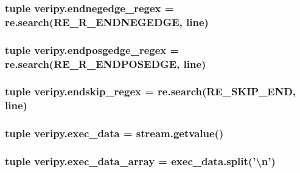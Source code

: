 \hypertarget{namespaceveripy_a9985df4799df5dec0cca48bdf7e184ac}{
\subsubsection[{endnegedge\-\_\-regex}]{\setlength{\rightskip}{0pt plus 5cm}tuple veripy.\-endnegedge\-\_\-regex = re.\-search(R\-E\-\_\-\-R\-\_\-\-E\-N\-D\-N\-E\-G\-E\-D\-G\-E, {\bf line})}}\label{namespaceveripy_a9985df4799df5dec0cca48bdf7e184ac}
\hypertarget{namespaceveripy_afd21c96a818fcc01594b0a193e25f0f3}{
\subsubsection[{endposgedge\-\_\-regex}]{\setlength{\rightskip}{0pt plus 5cm}tuple veripy.\-endposgedge\-\_\-regex = re.\-search(R\-E\-\_\-\-R\-\_\-\-E\-N\-D\-P\-O\-S\-E\-D\-G\-E, {\bf line})}}\label{namespaceveripy_afd21c96a818fcc01594b0a193e25f0f3}
\hypertarget{namespaceveripy_a982e8b68ecc8da4b47d07fce69736f5c}{
\subsubsection[{endskip\-\_\-regex}]{\setlength{\rightskip}{0pt plus 5cm}tuple veripy.\-endskip\-\_\-regex = re.\-search(R\-E\-\_\-\-S\-K\-I\-P\-\_\-\-E\-N\-D, {\bf line})}}\label{namespaceveripy_a982e8b68ecc8da4b47d07fce69736f5c}
\hypertarget{namespaceveripy_a3e3da32ab1aa18c45596c75506718d23}{
\subsubsection[{exec\-\_\-data}]{\setlength{\rightskip}{0pt plus 5cm}tuple veripy.\-exec\-\_\-data = stream.\-getvalue()}}\label{namespaceveripy_a3e3da32ab1aa18c45596c75506718d23}
\hypertarget{namespaceveripy_ab6310f745bd0a9df4e151b1e5dede66f}{
\subsubsection[{exec\-\_\-data\-\_\-array}]{\setlength{\rightskip}{0pt plus 5cm}tuple veripy.\-exec\-\_\-data\-\_\-array = exec\-\_\-data.\-split('\textbackslash{}n')}}\label{namespaceveripy_ab6310f745bd0a9df4e151b1e5dede66f}
